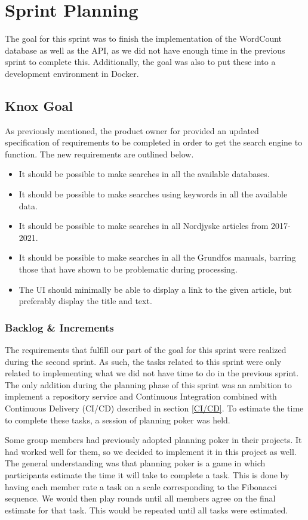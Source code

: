 \section{Sprint Planning}\label{sec:sprintPlanningSprint3}
The goal for this sprint was to finish the implementation of the WordCount database as well as the API, as we did not have enough time in the previous sprint to complete this. Additionally, the goal was also to put these into a development environment in Docker.

\subsection{Knox Goal}\label{ssec:sprint3Goal}
As previously mentioned, the product owner for \knox{} provided an updated specification of requirements to be completed in order to get the search engine to function. The new requirements are outlined below. 
\begin{itemize}
	\item It should be possible to make searches in all the available databases.
	\item It should be possible to make searches using keywords in all the available data.
	\item It should be possible to make searches in all Nordjyske articles from 2017-2021.
	\item It should be possible to make searches in all the Grundfos manuals, barring those that have shown to be problematic during processing.
	\item The UI should minimally be able to display a link to the given article, but preferably display the title and text.
\end{itemize}


\subsubsection{Backlog \& Increments}
The requirements that fulfill our part of the \knox{} goal for this sprint were realized during the second sprint. As such, the tasks related to this sprint were only related to implementing what we did not have time to do in the previous sprint. 
The only addition during the planning phase of this sprint was an ambition to implement a repository service and Continuous Integration combined with Continuous Delivery (CI/CD) described in section \ref{CI/CD}.
To estimate the time to complete these tasks, a session of planning poker was held. 

Some group members had previously adopted planning poker in their projects. It had worked well for them, so we decided to implement it in this project as well. The general understanding was that planning poker is a game in which participants estimate the time it will take to complete a task. This is done by having each member rate a task on a scale corresponding to the Fibonacci sequence. We would then play rounds until all members agree on the final estimate for that task. This would be repeated until all tasks were estimated.

